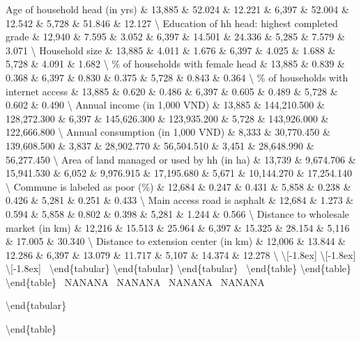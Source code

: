 \documentclass[
]{article}
\begin{document}
Age of household head (in yrs) \& 13,885 \& 52.024 \& 12.221 \& 6,397 \&
52.004 \& 12.542 \& 5,728 \& 51.846 \& 12.127 \textbackslash{} Education
of hh head: highest completed grade \& 12,940 \& 7.595 \& 3.052 \& 6,397
\& 14.501 \& 24.336 \& 5,285 \& 7.579 \& 3.071 \textbackslash{}
Household size \& 13,885 \& 4.011 \& 1.676 \& 6,397 \& 4.025 \& 1.688 \&
5,728 \& 4.091 \& 1.682 \textbackslash{} \% of households with female
head \& 13,885 \& 0.839 \& 0.368 \& 6,397 \& 0.830 \& 0.375 \& 5,728 \&
0.843 \& 0.364 \textbackslash{} \% of households with internet access \&
13,885 \& 0.620 \& 0.486 \& 6,397 \& 0.605 \& 0.489 \& 5,728 \& 0.602 \&
0.490 \textbackslash{} Annual income (in 1,000 VND) \& 13,885 \&
144,210.500 \& 128,272.300 \& 6,397 \& 145,626.300 \& 123,935.200 \&
5,728 \& 143,926.000 \& 122,666.800 \textbackslash{} Annual consumption
(in 1,000 VND) \& 8,333 \& 30,770.450 \& 139,608.500 \& 3,837 \&
28,902.770 \& 56,504.510 \& 3,451 \& 28,648.990 \& 56,277.450
\textbackslash{} Area of land managed or used by hh (in ha) \& 13,739 \&
9,674.706 \& 15,941.530 \& 6,052 \& 9,976.915 \& 17,195.680 \& 5,671 \&
10,144.270 \& 17,254.140 \textbackslash{} Commune is labeled as poor
(\%) \& 12,684 \& 0.247 \& 0.431 \& 5,858 \& 0.238 \& 0.426 \& 5,281 \&
0.251 \& 0.433 \textbackslash{} Main access road is asphalt \& 12,684 \&
1.273 \& 0.594 \& 5,858 \& 0.802 \& 0.398 \& 5,281 \& 1.244 \& 0.566
\textbackslash{} Distance to wholesale market (in km) \& 12,216 \&
15.513 \& 25.964 \& 6,397 \& 15.325 \& 28.154 \& 5,116 \& 17.005 \&
30.340 \textbackslash{} Distance to extension center (in km) \& 12,006
\& 13.844 \& 12.286 \& 6,397 \& 13.079 \& 11.717 \& 5,107 \& 14.374 \&
12.278 \textbackslash{} \hline \textbackslash{[}-1.8ex{]}
\hline \textbackslash{[}-1.8ex{]} \hline \textbackslash{[}-1.8ex{]}~
\textbackslash end\{tabular\} \textbackslash end\{tabular\}
\textbackslash end\{tabular\}~ \textbackslash end\{table\}
\textbackslash end\{table\} \textbackslash end\{table\}~ NANANA~ NANANA~
NANANA~ NANANA~ \hline

\textbackslash end\{tabular\}

\textbackslash end\{table\}
\end{document}
